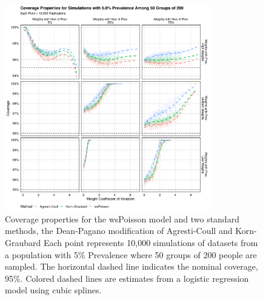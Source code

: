 \documentclass[AMA,STIX1COL]{WileyNJD-v2}
\begin{document}
\begin{figure}
\centering
\includegraphics[width=0.8\textwidth]{figures/perfect_coverage_50_groups_0_05_prev.pdf}
\caption{Coverage properties for the wsPoisson model and two standard methods, the Dean-Pagano modification of Agresti-Coull and Korn-Graubard
Each point represents 10,000 simulations of datasets from a population with 5\% Prevalence where 50 groups of 200 people are sampled.
The horizontal dashed line indicates the nominal coverage, 95\%.
Colored dashed lines are estimates from a logistic regression model using cubic splines.}
\label{fig:perfect_coverage_50_groups_0_05_prev}
\end{figure}
\end{document}
